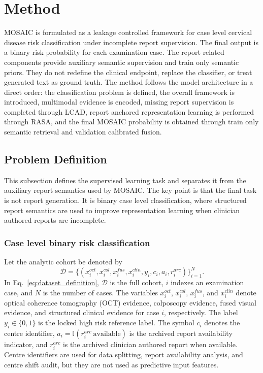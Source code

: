 \section{Method}
\label{sec:methods}

MOSAIC is formulated as a leakage controlled framework for case level cervical disease risk classification under incomplete report supervision. The final output is a binary risk probability for each examination case. The report related components provide auxiliary semantic supervision and train only semantic priors. They do not redefine the clinical endpoint, replace the classifier, or treat generated text as ground truth. The method follows the model architecture in a direct order: the classification problem is defined, the overall framework is introduced, multimodal evidence is encoded, missing report supervision is completed through LCAD, report anchored representation learning is performed through RASA, and the final MOSAIC probability is obtained through train only semantic retrieval and validation calibrated fusion.

\subsection{Problem Definition}
\label{subsec:methods_problem_definition}

This subsection defines the supervised learning task and separates it from the auxiliary report semantics used by MOSAIC. The key point is that the final task is not report generation. It is binary case level classification, where structured report semantics are used to improve representation learning when clinician authored reports are incomplete.

\subsubsection{Case level binary risk classification}
\label{subsubsec:case_level_binary_classification}

Let the analytic cohort be denoted by
\begin{equation}
\mathcal{D}=\{(x_i^{oct},x_i^{col},x_i^{fus},x_i^{clin},y_i,c_i,a_i,r_i^{arc})\}_{i=1}^{N}.
\label{eq:dataset_definition}
\end{equation}
In Eq.~\eqref{eq:dataset_definition}, $\mathcal{D}$ is the full cohort, $i$ indexes an examination case, and $N$ is the number of cases. The variables $x_i^{oct}$, $x_i^{col}$, $x_i^{fus}$, and $x_i^{clin}$ denote optical coherence tomography (OCT) evidence, colposcopy evidence, fused visual evidence, and structured clinical evidence for case $i$, respectively. The label $y_i\in\{0,1\}$ is the locked high risk reference label. The symbol $c_i$ denotes the centre identifier, $a_i=\mathbb{I}(r_i^{arc}\ \mathrm{available})$ is the archived report availability indicator, and $r_i^{arc}$ is the archived clinician authored report when available. Centre identifiers are used for data splitting, report availability analysis, and centre shift audit, but they are not used as predictive input features.

